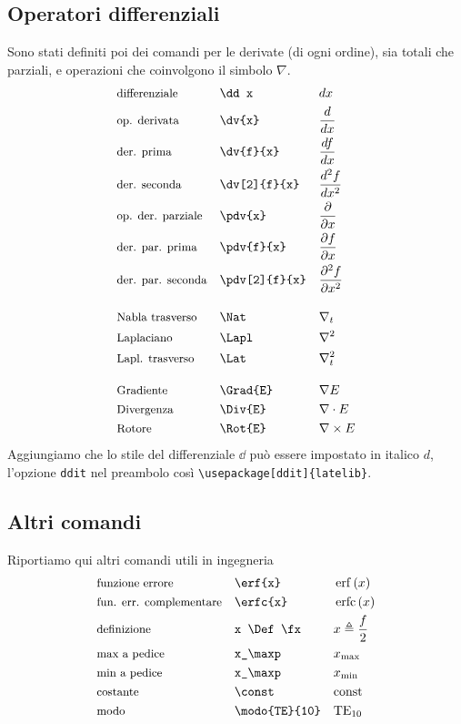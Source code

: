 \documentclass[11pt, a4paper ]{article}
\def\fx{\frac{f}{2}}
\def\sh{\textbackslash}
\begin{document}
\subsection*{Operatori differenziali}
Sono stati definiti poi dei comandi per le derivate (di ogni ordine), sia totali che parziali, e operazioni che coinvolgono il simbolo $\nabla$.
\begin{align*}
    &\text{\small differenziale} && \texttt{\sh dd x} && \dd x\\
    &\text{\small op. derivata} && \texttt{\sh dv\{x\}} && \dv{x}\\
    &\text{\small der. prima} && \texttt{\sh dv\{f\}\{x\}} && \dv{f}{x}\\ 
    &\text{\small der. seconda} && \texttt{\sh dv[2]\{f\}\{x\}} && \dv[2]{f}{x}\\
    &\text{\small op. der. parziale} && \texttt{\sh pdv\{x\}} && \pdv{x}\\
    &\text{\small der. par. prima} && \texttt{\sh pdv\{f\}\{x\}} && \pdv{f}{x}\\
    &\text{\small der. par. seconda} && \texttt{\sh pdv[2]\{f\}\{x\}} && \pdv[2]{f}{x}\\[1em]
    &\text{\small Nabla trasverso} && \texttt{\sh Nat} && \Nat\\
    &\text{\small Laplaciano} && \texttt{\sh Lapl} && \Lapl\\
    &\text{\small Lapl. trasverso} && \texttt{\sh Lat} && \Lat\\[1em]
    &\text{\small Gradiente} && \texttt{\sh Grad\{E\}} && \Grad{E}\\
    &\text{\small Divergenza} && \texttt{\sh Div\{E\}} && \Div{E}\\
    &\text{\small Rotore} && \texttt{\sh Rot\{E\}} && \Rot{E}
\end{align*}
Aggiungiamo che lo stile del differenziale $\dd$ può essere impostato in italico $d$, l'opzione \texttt{ddit} nel preambolo così \texttt{\sh usepackage[ddit]\{latelib\}}.


\subsection*{Altri comandi}
Riportiamo qui altri comandi utili in ingegneria
\begin{align*}
    &\text{\small funzione errore} && \texttt{\sh erf\{x\}} && \erf{x}\\
    &\text{\small fun. err. complementare} && \texttt{\sh erfc\{x\}} && \erfc{x}\\
    &\text{\small definizione} && \texttt{x \sh Def \sh fx} && x\Def\fx\\
    &\text{\small max a pedice} && \texttt{x\_\sh maxp} && x_\maxp\\
    &\text{\small min a pedice} && \texttt{x\_\sh maxp} && x_\minp\\
    &\text{\small costante} && \texttt{\sh const} && \const\\
    &\text{\small modo} && \texttt{\sh modo\{TE\}\{10\}} && \modo{TE}{10}
\end{align*}
\end{document}
